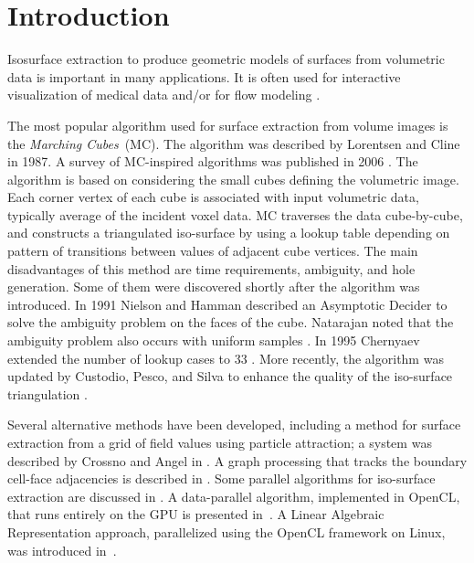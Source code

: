 \section{Introduction}\label{sec:intro}


Isosurface extraction to produce geometric models of surfaces from volumetric data is important in many applications. It is often used for interactive visualization of medical data and/or for flow modeling \cite{Rohan2018a}. 
 
The most popular algorithm used for surface extraction from volume images is the \emph{Marching Cubes}~(MC). The algorithm was described by Lorentsen and Cline \cite{Lorensen1987} in 1987. A survey of MC-inspired algorithms was published in 2006 \cite{Newman2006}. The algorithm is based on considering the small cubes defining the volumetric image. Each corner vertex of each cube is associated with input volumetric data, typically average of the incident voxel data. MC traverses the data cube-by-cube, and constructs a triangulated iso-surface by using a lookup table depending on pattern of transitions between values of adjacent cube vertices.   The main disadvantages of this method are time requirements, ambiguity, and hole generation. Some of them were discovered shortly after the algorithm was introduced. 
In 1991 Nielson and Hamman described an Asymptotic Decider to solve the ambiguity problem on the faces of the cube.  Natarajan noted that the ambiguity problem also occurs with uniform samples \cite{Natarajan1994}. In 1995 Chernyaev extended the number of lookup  cases to 33 \cite{chernyaev1995marching}. More recently, the algorithm was updated by Custodio, Pesco, and Silva to enhance the quality of the iso-surface triangulation \cite{Custodio2019}. 

Several alternative methods have been developed, including a method for surface extraction from a grid of field values using particle attraction; a system was described by Crossno and Angel in \cite{Crossno1997}. A graph processing that tracks the boundary cell-face adjacencies is described in \cite{Lachaud2000}. Some parallel algorithms for iso-surface extraction are discussed in \cite{Bajaj2004}.
A data-parallel algorithm, implemented in OpenCL, that runs entirely on the GPU is presented in~\cite{Smistad12}. 
A Linear Algebraic Representation approach, parallelized using the OpenCL framework on Linux, was introduced in~\cite{Paoluzzi2016}. %


